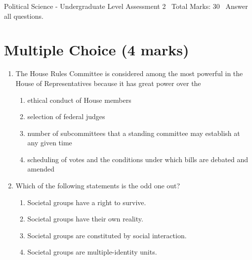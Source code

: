 \documentclass[12pt]{article}
\begin{document}
\begin{center}
Political Science - Undergraduate Level Assessment 2 \
Total Marks: 30 \
Answer all questions.
\end{center}

\section*{Multiple Choice (4 marks)}
\begin{enumerate}[label=\arabic*.]
\item The House Rules Committee is considered among the most powerful in the House of Representatives because it has great power over the
\begin{enumerate}[label=(\alph*)]
    \item ethical conduct of House members
    \item selection of federal judges
    \item number of subcommittees that a standing committee may establish at any given time
    \item scheduling of votes and the conditions under which bills are debated and amended
\end{enumerate}
\item Which of the following statements is the odd one out?
\begin{enumerate}[label=(\alph*)]
    \item Societal groups have a right to survive.
    \item Societal groups have their own reality.
    \item Societal groups are constituted by social interaction.
    \item Societal groups are multiple-identity units.
\end{enumerate}
\end{enumerate}
\end{document}
